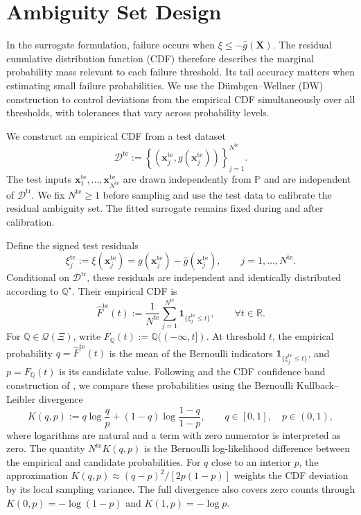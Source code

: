 \documentclass[review,11pt,3p,authoryear,nopreprintline]{elsarticle}
\begin{document}
\section{Ambiguity Set Design}
\label{sec-ambiguity-set}

In the surrogate formulation, failure occurs when $\xi\le-\hat g(\bm X)$. The residual cumulative distribution function (CDF) therefore describes the marginal probability mass relevant to each failure threshold. Its tail accuracy matters when estimating small failure probabilities. We use the D\"umbgen--Wellner (DW) construction \citep{L.J23} to control deviations from the empirical CDF simultaneously over all thresholds, with tolerances that vary across probability levels.

We construct an empirical CDF from a test dataset
\[
  \mathcal D^{\mathrm{te}}:=\left\{\left(\bm x_j^{\mathrm{te}},g(\bm x_j^{\mathrm{te}})\right)\right\}_{j=1}^{N^{\mathrm{te}}}.
\]
The test inputs $\bm x_1^{\mathrm{te}},\ldots,\bm x_{N^{\mathrm{te}}}^{\mathrm{te}}$ are drawn independently from $\mathbb P$ and are independent of $\mathcal D^{\mathrm{tr}}$. We fix $N^{\mathrm{te}}\ge1$ before sampling and use the test data to calibrate the residual ambiguity set. The fitted surrogate remains fixed during and after calibration.

Define the signed test residuals
\[
  \xi_j^{\mathrm{te}}:=\xi(\bm x_j^{\mathrm{te}})=g(\bm x_j^{\mathrm{te}})-\hat g(\bm x_j^{\mathrm{te}}),\qquad j=1,\ldots,N^{\mathrm{te}}.
\]
Conditional on $\mathcal D^{\mathrm{tr}}$, these residuals are independent and identically distributed according to $\mathbb Q^\star$. Their empirical CDF is
\begin{equation}
  \widehat F^{\mathrm{te}}(t):=\frac{1}{N^{\mathrm{te}}}\sum_{j=1}^{N^{\mathrm{te}}}\mathbf 1_{\{\xi_j^{\mathrm{te}}\le t\}},\qquad \forall t\in\mathbb R.
  \label{eq-empirical-cdf}
\end{equation}
For $\mathbb Q\in\mathcal Q(\Xi)$, write $F_{\mathbb Q}(t):=\mathbb Q(({-\infty},t])$. At threshold $t$, the empirical probability $q=\widehat F^{\mathrm{te}}(t)$ is the mean of the Bernoulli indicators $\mathbf 1_{\{\xi_j^{\mathrm{te}}\le t\}}$, and $p=F_{\mathbb Q}(t)$ is its candidate value. Following \citet{B.J79} and the CDF confidence band construction of \citet{O95}, we compare these probabilities using the Bernoulli Kullback--Leibler divergence
\begin{equation}
  K(q,p):=q\log\frac{q}{p}+(1-q)\log\frac{1-q}{1-p},\qquad q\in[0,1],\quad p\in(0,1),
  \label{eq-bernoulli-kl}
\end{equation}
where logarithms are natural and a term with zero numerator is interpreted as zero. The quantity $N^{\mathrm{te}}K(q,p)$ is the Bernoulli log-likelihood difference between the empirical and candidate probabilities. For $q$ close to an interior $p$, the approximation $K(q,p)\approx(q-p)^2/[2p(1-p)]$ weights the CDF deviation by its local sampling variance. The full divergence also covers zero counts through $K(0,p)=-\log(1-p)$ and $K(1,p)=-\log p$.
\end{document}
